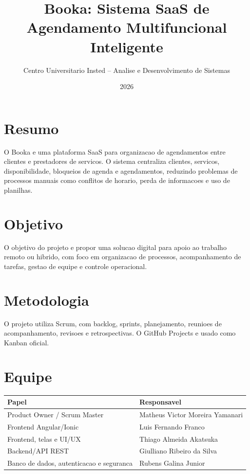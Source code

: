 \documentclass[12pt,a4paper]{article}
\title{Booka: Sistema SaaS de Agendamento Multifuncional Inteligente}
\author{Centro Universitario Insted -- Analise e Desenvolvimento de Sistemas}
\date{2026}
\begin{document}
\maketitle

\section{Resumo}

O Booka e uma plataforma SaaS para organizacao de agendamentos entre clientes e prestadores de servicos. O sistema centraliza clientes, servicos, disponibilidade, bloqueios de agenda e agendamentos, reduzindo problemas de processos manuais como conflitos de horario, perda de informacoes e uso de planilhas.

\section{Objetivo}

O objetivo do projeto e propor uma solucao digital para apoio ao trabalho remoto ou hibrido, com foco em organizacao de processos, acompanhamento de tarefas, gestao de equipe e controle operacional.

\section{Metodologia}

O projeto utiliza Scrum, com backlog, sprints, planejamento, reunioes de acompanhamento, revisoes e retrospectivas. O GitHub Projects e usado como Kanban oficial.

\section{Equipe}

\begin{longtable}{|p{6cm}|p{8cm}|}
\hline
\textbf{Papel} & \textbf{Responsavel} \\
\hline
Product Owner / Scrum Master & Matheus Victor Moreira Yamanari \\
\hline
Frontend Angular/Ionic & Luis Fernando Franco \\
\hline
Frontend, telas e UI/UX & Thiago Almeida Akatsuka \\
\hline
Backend/API REST & Giulliano Ribeiro da Silva \\
\hline
Banco de dados, autenticacao e seguranca & Rubens Galina Junior \\
\hline
\end{longtable}
\end{document}
